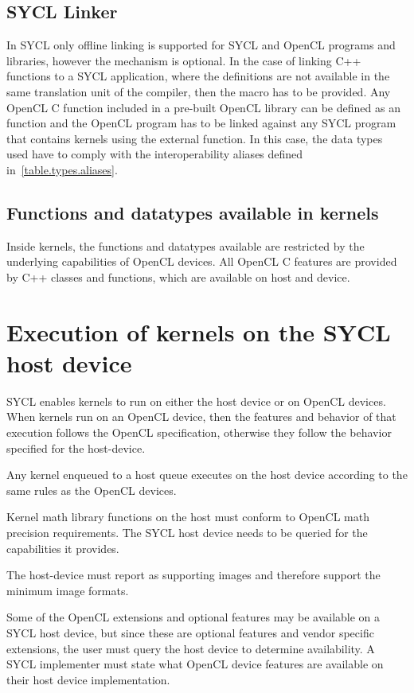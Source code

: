 \subsection{SYCL Linker}

In SYCL only offline linking is supported for SYCL and OpenCL programs
and libraries, however the mechanism is optional.
In the case of linking C++ functions to a SYCL application,
where the definitions are not available in the
same translation unit of the compiler, then the macro 
has to be provided.
Any OpenCL C function included in a pre-built OpenCL library can be
defined as an  function and the OpenCL program
has to be linked against any SYCL program that contains kernels using
the external function. In this case, the data types used have to comply with
the interoperability aliases defined in~\ref{table.types.aliases}.

\subsection{Functions and datatypes available in kernels}


Inside kernels, the functions and datatypes available are restricted by the
underlying capabilities of OpenCL devices. All OpenCL C features are provided
by C++ classes and functions, which are available on host and device.


\section{Execution of kernels on the SYCL host device}

SYCL enables kernels to run on either the host device or on OpenCL devices. When
kernels run on an OpenCL device, then the features and behavior of that
execution follows the OpenCL specification, otherwise they follow the behavior
specified for the \gls{host-device}.

Any kernel enqueued to a host queue executes on the host device according to the
same rules as the OpenCL devices.

Kernel math library functions on the host must conform to OpenCL math precision
requirements. The SYCL host device needs to be queried for the capabilities it provides.

The \gls{host-device} must report as supporting images and therefore support
the minimum image formats.

Some of the OpenCL extensions and optional features may be available on a SYCL
host device, but since these are optional features and vendor specific
extensions, the user must query the host device to determine availability. A
SYCL implementer must state what OpenCL device features are available on
their host device implementation.

